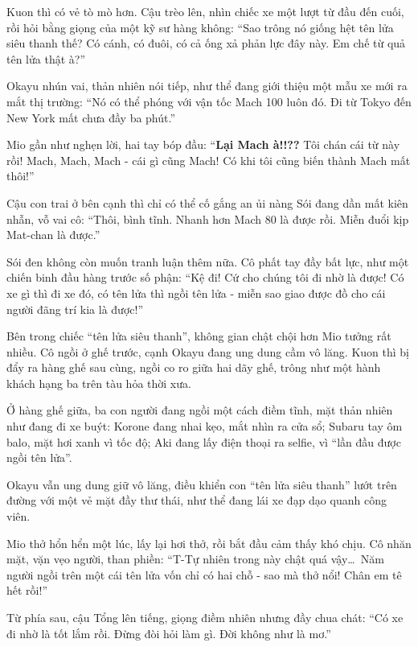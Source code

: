 \documentclass[../main.tex]{subfiles}
\begin{document}
Kuon thì có vẻ tò mò hơn. Cậu trèo lên, nhìn chiếc xe một lượt từ đầu đến cuối, rồi hỏi bằng giọng của một kỹ sư hàng không: ``Sao trông nó giống hệt tên lửa siêu thanh thế? Có cánh, có đuôi, có cả ống xả phản lực đây này. Em chế từ quả tên lửa thật à?''

Okayu nhún vai, thản nhiên nói tiếp, như thể đang giới thiệu một mẫu xe mới ra mắt thị trường: ``Nó có thể phóng với vận tốc Mach 100 luôn đó. Đi từ Tokyo đến New York mất chưa đầy ba phút.''

Mio gần như nghẹn lời, hai tay bóp đầu: ``\textbf{Lại Mach à!!??} Tôi chán cái từ này rồi! Mach, Mach, Mach - cái gì cũng Mach! Có khi tôi cũng biến thành Mach mất thôi!''

Cậu con trai ở bên cạnh thì chỉ có thể cố gắng an ủi nàng Sói đang dần mất kiên nhẫn, vỗ vai cô: ``Thôi, bình tĩnh. Nhanh hơn Mach 80 là được rồi. Miễn đuổi kịp Mat-chan là được.''

Sói đen không còn muốn tranh luận thêm nữa. Cô phất tay đầy bất lực, như một chiến binh đầu hàng trước số phận: ``Kệ đi! Cứ cho chúng tôi đi nhờ là được! Có xe gì thì đi xe đó, có tên lửa thì ngồi tên lửa - miễn sao giao được đồ cho cái người đãng trí kia là được!''

\ct

Bên trong chiếc ``tên lửa siêu thanh'', không gian chật chội hơn Mio tưởng rất nhiều. Cô ngồi ở ghế trước, cạnh Okayu đang ung dung cầm vô lăng. Kuon thì bị đẩy ra hàng ghế sau cùng, ngồi co ro giữa hai dãy ghế, trông như một hành khách hạng ba trên tàu hỏa thời xưa.

Ở hàng ghế giữa, ba con người đang ngồi một cách điềm tĩnh, mặt thản nhiên như đang đi xe buýt: Korone đang nhai kẹo, mắt nhìn ra cửa sổ; Subaru tay ôm balo, mặt hơi xanh vì tốc độ; Aki đang lấy điện thoại ra selfie, vì ``lần đầu được ngồi tên lửa''.

Okayu vẫn ung dung giữ vô lăng, điều khiển con ``tên lửa siêu thanh'' lướt trên đường với một vẻ mặt đầy thư thái, như thể đang lái xe đạp dạo quanh công viên.


Mio thở hổn hển một lúc, lấy lại hơi thở, rồi bắt đầu cảm thấy khó chịu. Cô nhăn mặt, vặn vẹo người, than phiền: ``T-Tự nhiên trong này chật quá vậy\dots\ Năm người ngồi trên một cái tên lửa vốn chỉ có hai chỗ - sao mà thở nổi! Chân em tê hết rồi!''

Từ phía sau, cậu Tổng lên tiếng, giọng điềm nhiên nhưng đầy chua chát: ``Có xe đi nhờ là tốt lắm rồi. Đừng đòi hỏi làm gì. Đời không như là mơ.''
\end{document}
